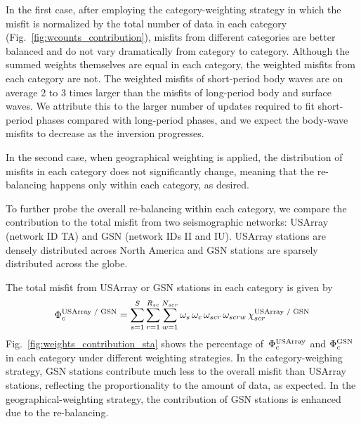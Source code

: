 In the first case, after employing the category-weighting strategy in which the misfit is normalized by the 
total number of data in each category (Fig.~\ref{fig:wcounts_contribution}), misfits from different categories are better balanced 
and do not vary dramatically from category to category.  Although the 
summed weights themselves are equal in each category, the weighted misfits from each category 
are not.  The weighted misfits of short-period body waves are on average 2 to 3 
times larger than the misfits of long-period body and surface waves. We attribute this to the larger number of updates required to fit short-period phases compared with long-period phases, and we expect the body-wave misfits to decrease as the inversion progresses. 

In the second case, when geographical weighting is applied, the distribution of 
misfits in each category does not significantly change, meaning that the  re-balancing happens only within each category, as desired.

To further probe the overall re-balancing within each category, we compare the contribution to the total misfit from  two seismographic networks:  USArray (network ID TA) and GSN (network IDs II and IU).
USArray stations are densely distributed across North America and GSN stations are sparsely distributed across the  globe.

The total  misfit from USArray or GSN stations in each category is given by
\begin{equation}
\Phi_{c}^{\text{\scriptsize USArray / GSN}} = \sum_{s=1}^{S} \sum_{r=1}^{R_{sc}} \sum_{w=1}^{N_{scr}} \omega_s\, \omega_{c}\, \omega_{scr}\, \omega_{scrw}\,\chi_{scr}^{\text{\scriptsize USArray / GSN}}
\end{equation}
Fig.~\ref{fig:weights_contribution_sta} shows the percentage of~$\Phi_{c}^\text{\scriptsize USArray}$ and  
$\Phi_{c}^\text{\scriptsize GSN}$ in each category under different weighting strategies.
In the category-weighing strategy, GSN stations contribute much less to the overall misfit than  
USArray stations, reflecting the proportionality to the amount of data, as expected.
In the geographical-weighting strategy, the contribution 
of GSN stations is enhanced due to the re-balancing. 

